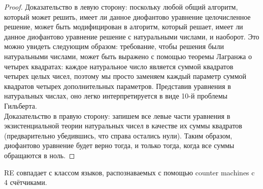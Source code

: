     \begin{proof}
        Доказательство в левую сторону: поскольку любой общий алгоритм, который может решить, имеет ли данное диофантово уравнение целочисленное решение, может быть модифицирован в алгоритм, который решает, имеет ли данное диофантово уравнение решение с натуральными числами, и наоборот.  Это можно увидеть следующим образом: требование, чтобы решения были натуральными числами, может быть выражено с помощью теоремы Лагранжа о четырех квадратах: каждое натуральное число является суммой квадратов четырех целых чисел, поэтому мы просто заменяем каждый параметр суммой квадратов четырех дополнительных параметров. Представив уравнения в натуральных числах, оно легко интерпретируется в виде 10-й проблемы Гильберта.\\
        Доказательство в правую сторону: запишем все левые части уравнения в экзистенциальной теории натуральных чисел в качестве их суммы квадратов (предварительно убедившись, что справа остались нули). Таким образом, диофантово уравнение будет верно тогда, и только тогда, когда все суммы обращаются в ноль.
    \end{proof}
    
    
    
    \begin{Thm}
         RE совпадает с классом языков, распознаваемых с помощью counter machines c 4 счётчиками.
    \end{Thm}
    
